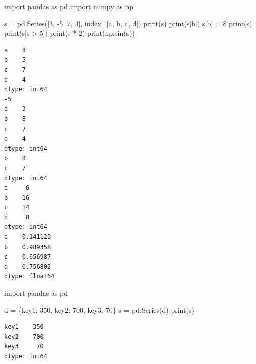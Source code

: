 \documentclass[
  english,
  letterpaper,
  DIV=11,
  numbers=noendperiod]{scrreprt}
\newenvironment{Shaded}{\begin{snugshade}}{\end{snugshade}}
\newcommand{\BuiltInTok}[1]{\textcolor[rgb]{0.00,0.23,0.31}{#1}}
\newcommand{\DecValTok}[1]{\textcolor[rgb]{0.68,0.00,0.00}{#1}}
\newcommand{\ImportTok}[1]{\textcolor[rgb]{0.00,0.46,0.62}{#1}}
\newcommand{\NormalTok}[1]{\textcolor[rgb]{0.00,0.23,0.31}{#1}}
\newcommand{\OperatorTok}[1]{\textcolor[rgb]{0.37,0.37,0.37}{#1}}
\newcommand{\StringTok}[1]{\textcolor[rgb]{0.13,0.47,0.30}{#1}}
\begin{document}
\begin{Shaded}
\begin{Highlighting}[]
\ImportTok{import}\NormalTok{ pandas }\ImportTok{as}\NormalTok{ pd}
\ImportTok{import}\NormalTok{ numpy }\ImportTok{as}\NormalTok{ np}

\NormalTok{s }\OperatorTok{=}\NormalTok{ pd.Series([}\DecValTok{3}\NormalTok{, }\OperatorTok{{-}}\DecValTok{5}\NormalTok{, }\DecValTok{7}\NormalTok{, }\DecValTok{4}\NormalTok{], index}\OperatorTok{=}\NormalTok{[}\StringTok{\textquotesingle{}a\textquotesingle{}}\NormalTok{, }\StringTok{\textquotesingle{}b\textquotesingle{}}\NormalTok{, }\StringTok{\textquotesingle{}c\textquotesingle{}}\NormalTok{, }\StringTok{\textquotesingle{}d\textquotesingle{}}\NormalTok{])}
\BuiltInTok{print}\NormalTok{(s)}
\BuiltInTok{print}\NormalTok{(s[}\StringTok{\textquotesingle{}b\textquotesingle{}}\NormalTok{])}
\NormalTok{s[}\StringTok{\textquotesingle{}b\textquotesingle{}}\NormalTok{] }\OperatorTok{=} \DecValTok{8}
\BuiltInTok{print}\NormalTok{(s)}
\BuiltInTok{print}\NormalTok{(s[s }\OperatorTok{\textgreater{}} \DecValTok{5}\NormalTok{])}
\BuiltInTok{print}\NormalTok{(s }\OperatorTok{*} \DecValTok{2}\NormalTok{)}
\BuiltInTok{print}\NormalTok{(np.sin(s))}
\end{Highlighting}
\end{Shaded}

\begin{verbatim}
a    3
b   -5
c    7
d    4
dtype: int64
-5
a    3
b    8
c    7
d    4
dtype: int64
b    8
c    7
dtype: int64
a     6
b    16
c    14
d     8
dtype: int64
a    0.141120
b    0.989358
c    0.656987
d   -0.756802
dtype: float64
\end{verbatim}

\begin{Shaded}
\begin{Highlighting}[]
\ImportTok{import}\NormalTok{ pandas }\ImportTok{as}\NormalTok{ pd}

\NormalTok{d }\OperatorTok{=}\NormalTok{ \{}\StringTok{\textquotesingle{}key1\textquotesingle{}}\NormalTok{: }\DecValTok{350}\NormalTok{, }\StringTok{\textquotesingle{}key2\textquotesingle{}}\NormalTok{: }\DecValTok{700}\NormalTok{, }\StringTok{\textquotesingle{}key3\textquotesingle{}}\NormalTok{: }\DecValTok{70}\NormalTok{\}}
\NormalTok{s }\OperatorTok{=}\NormalTok{ pd.Series(d)}
\BuiltInTok{print}\NormalTok{(s)}
\end{Highlighting}
\end{Shaded}

\begin{verbatim}
key1    350
key2    700
key3     70
dtype: int64
\end{verbatim}
\end{document}
